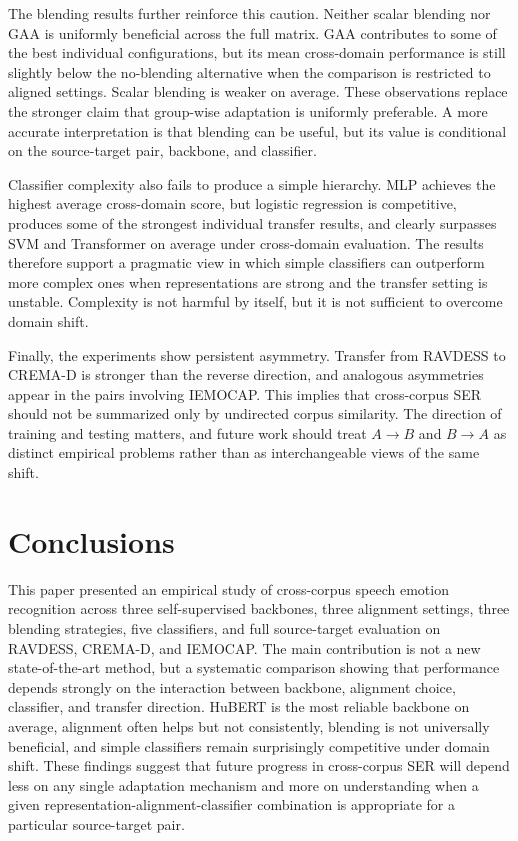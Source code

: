 ﻿\documentclass[10pt,twocolumn,letterpaper]{article}
\begin{document}
The blending results further reinforce this caution. Neither scalar blending nor GAA is uniformly beneficial across the full matrix. GAA contributes to some of the best individual configurations, but its mean cross-domain performance is still slightly below the no-blending alternative when the comparison is restricted to aligned settings. Scalar blending is weaker on average. These observations replace the stronger claim that group-wise adaptation is uniformly preferable. A more accurate interpretation is that blending can be useful, but its value is conditional on the source-target pair, backbone, and classifier.

Classifier complexity also fails to produce a simple hierarchy. MLP achieves the highest average cross-domain score, but logistic regression is competitive, produces some of the strongest individual transfer results, and clearly surpasses SVM and Transformer on average under cross-domain evaluation. The results therefore support a pragmatic view in which simple classifiers can outperform more complex ones when representations are strong and the transfer setting is unstable. Complexity is not harmful by itself, but it is not sufficient to overcome domain shift.

Finally, the experiments show persistent asymmetry. Transfer from RAVDESS to CREMA-D is stronger than the reverse direction, and analogous asymmetries appear in the pairs involving IEMOCAP. This implies that cross-corpus SER should not be summarized only by undirected corpus similarity. The direction of training and testing matters, and future work should treat $A \rightarrow B$ and $B \rightarrow A$ as distinct empirical problems rather than as interchangeable views of the same shift.

\section*{Conclusions}
This paper presented an empirical study of cross-corpus speech emotion recognition across three self-supervised backbones, three alignment settings, three blending strategies, five classifiers, and full source-target evaluation on RAVDESS, CREMA-D, and IEMOCAP. The main contribution is not a new state-of-the-art method, but a systematic comparison showing that performance depends strongly on the interaction between backbone, alignment choice, classifier, and transfer direction. HuBERT is the most reliable backbone on average, alignment often helps but not consistently, blending is not universally beneficial, and simple classifiers remain surprisingly competitive under domain shift. These findings suggest that future progress in cross-corpus SER will depend less on any single adaptation mechanism and more on understanding when a given representation-alignment-classifier combination is appropriate for a particular source-target pair.
\end{document}

